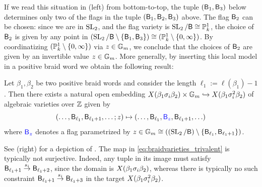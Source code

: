 If we read this situation in  (left) from bottom-to-top, the tuple $(\mathsf{B}_1,\mathsf{B}_3)$ below determines only two of the flags in the tuple $(\mathsf{B}_1,\mathsf{B}_2,\mathsf{B}_3)$ above. The flag $\mathsf{B}_2$ can be chosen: since we are in $\operatorname{SL}_2$, and the flag variety is $\operatorname{SL}_2/\mathsf{B}\cong\mathbb{P}_k^1$, the choice of $\mathsf{B}_2$ is given by any point in $(\operatorname{SL}_2/\mathsf{B}\setminus\{\mathsf{B}_1,\mathsf{B}_3\})\cong(\mathbb{P}_k^1\setminus\{0,\infty\})$. By coordinatizing $(\mathbb{P}_k^1\setminus\{0,\infty\})$ via $z\in\mathbb{G}_m$, we conclude that the choices of $\mathsf{B}_2$ are given by an invertible value $z\in\mathbb{G}_m$. More generally, by inserting this local model in a positive braid word we obtain the following result:

\begin{lemma}\label{lem:braidvarieties_trivalent}
Let $\beta_1,\beta_2$ be two positive braid words and consider the length $\ell_1:=\ell(\beta_1)-1$. Then there exists a natural open embedding $X(\beta_1\sigma_i\beta_2)\times\mathbb{G}_m\hookrightarrow X(\beta_1\sigma_i^2\beta_2)$ of algebraic varieties over $\mathbb{Z}$ given by
\begin{equation}\label{eq:braidvarieties_trivalent}
(\ldots,\mathsf{B}_{\ell_1},\mathsf{B}_{\ell_1+1},\ldots;z)\mapsto (\ldots,\mathsf{B}_{\ell_1},\color{blue}\mathsf{B}_{z}\color{black},\mathsf{B}_{\ell_1+1},\ldots)
\end{equation}
where $\color{blue}\mathsf{B}_{z}\color{black}$ denotes a flag parametrized by $z\in\mathbb{G}_m\cong ((\operatorname{SL}_2/\mathsf{B})\setminus\{\mathsf{B}_{\ell_1},\mathsf{B}_{\ell_1+1}\})$.\sbs
\end{lemma}

\noindent See  (right) for a depiction of . The map in \eqref{eq:braidvarieties_trivalent} is typically not surjective. Indeed, any tuple in its image must satisfy $\mathsf{B}_{\ell_1+1}\stackrel{s_i}{\to}\mathsf{B}_{\ell_1+2}$, since the domain is $X(\beta_1\sigma_i\beta_2)$, whereas there is typically no such constraint $\mathsf{B}_{\ell_1+1}\stackrel{s_i}{\to}\mathsf{B}_{\ell_1+3}$ in the target $X(\beta_1\sigma_i^2\beta_2)$.

